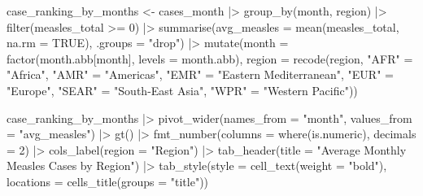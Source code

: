\documentclass[
  letterpaper,
  DIV=11,
  numbers=noendperiod]{scrartcl}
\newenvironment{Shaded}{\begin{snugshade}}{\end{snugshade}}
\newcommand{\AttributeTok}[1]{\textcolor[rgb]{0.40,0.45,0.13}{#1}}
\newcommand{\ConstantTok}[1]{\textcolor[rgb]{0.56,0.35,0.01}{#1}}
\newcommand{\DecValTok}[1]{\textcolor[rgb]{0.68,0.00,0.00}{#1}}
\newcommand{\FunctionTok}[1]{\textcolor[rgb]{0.28,0.35,0.67}{#1}}
\newcommand{\NormalTok}[1]{\textcolor[rgb]{0.00,0.23,0.31}{#1}}
\newcommand{\OtherTok}[1]{\textcolor[rgb]{0.00,0.23,0.31}{#1}}
\newcommand{\SpecialCharTok}[1]{\textcolor[rgb]{0.37,0.37,0.37}{#1}}
\newcommand{\StringTok}[1]{\textcolor[rgb]{0.13,0.47,0.30}{#1}}
\begin{document}
\begin{Shaded}
\begin{Highlighting}[]
\NormalTok{case\_ranking\_by\_months }\OtherTok{\textless{}{-}}\NormalTok{ cases\_month }\SpecialCharTok{|\textgreater{}}
  \FunctionTok{group\_by}\NormalTok{(month, region) }\SpecialCharTok{|\textgreater{}}
  \FunctionTok{filter}\NormalTok{(measles\_total }\SpecialCharTok{\textgreater{}=} \DecValTok{0}\NormalTok{) }\SpecialCharTok{|\textgreater{}}
  \FunctionTok{summarise}\NormalTok{(}\AttributeTok{avg\_measles =} \FunctionTok{mean}\NormalTok{(measles\_total, }\AttributeTok{na.rm =} \ConstantTok{TRUE}\NormalTok{), }\AttributeTok{.groups =} \StringTok{"drop"}\NormalTok{) }\SpecialCharTok{|\textgreater{}}
  \FunctionTok{mutate}\NormalTok{(}\AttributeTok{month =} \FunctionTok{factor}\NormalTok{(month.abb[month], }\AttributeTok{levels =}\NormalTok{ month.abb),}
         \AttributeTok{region =} \FunctionTok{recode}\NormalTok{(region, }\StringTok{"AFR"} \OtherTok{=} \StringTok{"Africa"}\NormalTok{, }
                         \StringTok{"AMR"} \OtherTok{=} \StringTok{"Americas"}\NormalTok{, }
                         \StringTok{"EMR"} \OtherTok{=} \StringTok{"Eastern Mediterranean"}\NormalTok{, }
                         \StringTok{"EUR"} \OtherTok{=} \StringTok{"Europe"}\NormalTok{, }
                         \StringTok{"SEAR"} \OtherTok{=} \StringTok{"South{-}East Asia"}\NormalTok{, }
                         \StringTok{"WPR"} \OtherTok{=} \StringTok{"Western Pacific"}\NormalTok{)) }

\NormalTok{case\_ranking\_by\_months }\SpecialCharTok{|\textgreater{}}
  \FunctionTok{pivot\_wider}\NormalTok{(}\AttributeTok{names\_from =} \StringTok{"month"}\NormalTok{,}
              \AttributeTok{values\_from =} \StringTok{"avg\_measles"}\NormalTok{) }\SpecialCharTok{|\textgreater{}}
  \FunctionTok{gt}\NormalTok{() }\SpecialCharTok{|\textgreater{}}
  \FunctionTok{fmt\_number}\NormalTok{(}\AttributeTok{columns =} \FunctionTok{where}\NormalTok{(is.numeric), }\AttributeTok{decimals =} \DecValTok{2}\NormalTok{) }\SpecialCharTok{|\textgreater{}}
  \FunctionTok{cols\_label}\NormalTok{(}\AttributeTok{region =} \StringTok{"Region"}\NormalTok{) }\SpecialCharTok{|\textgreater{}}
  \FunctionTok{tab\_header}\NormalTok{(}\AttributeTok{title =} \StringTok{"Average Monthly Measles Cases by Region"}\NormalTok{) }\SpecialCharTok{|\textgreater{}}
  \FunctionTok{tab\_style}\NormalTok{(}\AttributeTok{style =} \FunctionTok{cell\_text}\NormalTok{(}\AttributeTok{weight =} \StringTok{"bold"}\NormalTok{),}
            \AttributeTok{locations =} \FunctionTok{cells\_title}\NormalTok{(}\AttributeTok{groups =} \StringTok{"title"}\NormalTok{))}
\end{Highlighting}
\end{Shaded}
\end{document}
